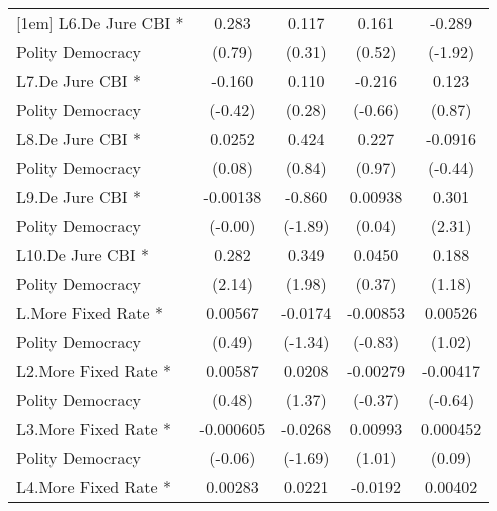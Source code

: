 {\begin{tabular}{l*{4}{c}}
[1em]
L6.De Jure CBI *    &       0.283         &       0.117         &       0.161         &      -0.289         \\
Polity Democracy    &      (0.79)         &      (0.31)         &      (0.52)         &     (-1.92)         \\
[1em]
L7.De Jure CBI *    &      -0.160         &       0.110         &      -0.216         &       0.123         \\
Polity Democracy    &     (-0.42)         &      (0.28)         &     (-0.66)         &      (0.87)         \\
[1em]
L8.De Jure CBI *    &      0.0252         &       0.424         &       0.227         &     -0.0916         \\
Polity Democracy    &      (0.08)         &      (0.84)         &      (0.97)         &     (-0.44)         \\
[1em]
L9.De Jure CBI *    &    -0.00138         &      -0.860         &     0.00938         &       0.301\sym{*}  \\
Polity Democracy    &     (-0.00)         &     (-1.89)         &      (0.04)         &      (2.31)         \\
[1em]
L10.De Jure CBI *   &       0.282\sym{*}  &       0.349\sym{*}  &      0.0450         &       0.188         \\
Polity Democracy    &      (2.14)         &      (1.98)         &      (0.37)         &      (1.18)         \\
[1em]
L.More Fixed Rate * &     0.00567         &     -0.0174         &    -0.00853         &     0.00526         \\
Polity Democracy    &      (0.49)         &     (-1.34)         &     (-0.83)         &      (1.02)         \\
[1em]
L2.More Fixed Rate *&     0.00587         &      0.0208         &    -0.00279         &    -0.00417         \\
Polity Democracy    &      (0.48)         &      (1.37)         &     (-0.37)         &     (-0.64)         \\
[1em]
L3.More Fixed Rate *&   -0.000605         &     -0.0268         &     0.00993         &    0.000452         \\
Polity Democracy    &     (-0.06)         &     (-1.69)         &      (1.01)         &      (0.09)         \\
[1em]
L4.More Fixed Rate *&     0.00283         &      0.0221         &     -0.0192         &     0.00402         \\

\end{tabular}}
